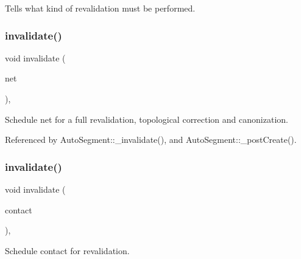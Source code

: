 Tells what kind of revalidation must be performed. \mbox{\label{classKatabatic_1_1Session_ae310a7c2c301b7e5f90fba5d34cc5be9}} 
\subsubsection{\texorpdfstring{invalidate()}{invalidate()}\hspace{0.1cm}{\footnotesize\ttfamily [1/3]}}
{\footnotesize\ttfamily void invalidate (\begin{DoxyParamCaption}\item[{\textbf{ Net} $\ast$}]{net }\end{DoxyParamCaption})\hspace{0.3cm}{\ttfamily [inline]}, {\ttfamily [static]}}

Schedule {\ttfamily net} for a full revalidation, topological correction and canonization. 

Referenced by Auto\+Segment\+::\+\_\+invalidate(), and Auto\+Segment\+::\+\_\+post\+Create().

\mbox{\label{classKatabatic_1_1Session_a1f8da0ae3a9d714c1dfae69904acec5f}} 
\subsubsection{\texorpdfstring{invalidate()}{invalidate()}\hspace{0.1cm}{\footnotesize\ttfamily [2/3]}}
{\footnotesize\ttfamily void invalidate (\begin{DoxyParamCaption}\item[{\mbox{\hyperlink{classKatabatic_1_1AutoContact}{Auto\+Contact}} $\ast$}]{contact }\end{DoxyParamCaption})\hspace{0.3cm}{\ttfamily [inline]}, {\ttfamily [static]}}

Schedule {\ttfamily contact} for revalidation. \mbox{\label{classKatabatic_1_1Session_a7968875ccb5abb2c6f6d5dec92027550}} 
